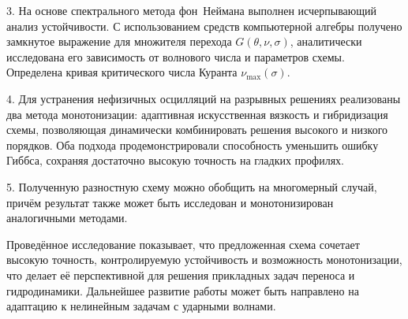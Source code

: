\documentclass[14pt]{report}
\begin{document}
3. На основе спектрального метода фон~\mbox{Неймана} выполнен исчерпывающий анализ устойчивости. С использованием средств компьютерной алгебры получено замкнутое выражение для множителя перехода $G(\theta,\nu,\sigma)$, аналитически исследована его зависимость от волнового числа и параметров схемы. Определена кривая критического числа Куранта $\nu_{\max}(\sigma)$.

4. Для устранения нефизичных осцилляций на разрывных решениях реализованы два метода монотонизации: адаптивная искусственная вязкость и гибридизация схемы, позволяющая динамически комбинировать решения высокого и низкого порядков. Оба подхода продемонстрировали способность уменьшить ошибку Гиббса, сохраняя достаточно высокую точность на гладких профилях.

5. Полученную разностную схему можно обобщить на многомерный случай, причём результат также может быть исследован и монотонизирован аналогичными методами.

Проведённое исследование показывает, что предложенная схема сочетает высокую точность, контролируемую устойчивость и возможность монотонизации, что делает её перспективной для решения прикладных задач переноса и гидродинамики. Дальнейшее развитие работы может быть направлено на адаптацию к нелинейным задачам с ударными волнами.

\clearpage


\end{document}
